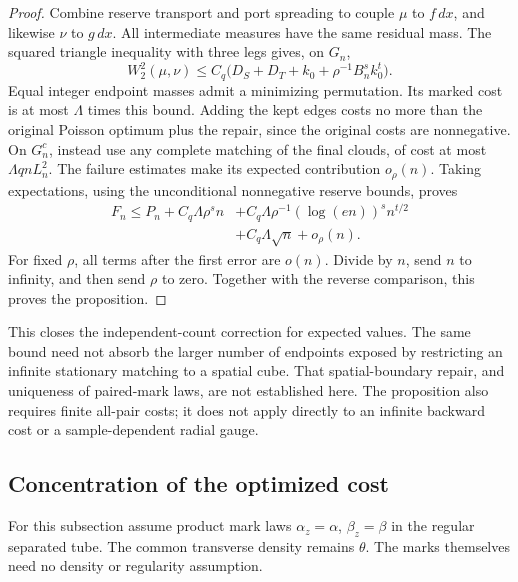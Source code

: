 \documentclass[11pt,reqno]{amsart}
\theoremstyle{definition}
\theoremstyle{remark}
\numberwithin{equation}{section}
\begin{document}
\begin{proof}
Combine reserve transport and port spreading to couple \(\mu\)
to \(f\,dx\), and likewise \(\nu\) to \(g\,dx\).
All intermediate measures have the same residual mass. The squared
triangle inequality with three legs gives, on \(G_n\),
\[
W_2^2(\mu,\nu)
 \le C_q\bigl(D_S+D_T+k_0+\rho^{-1}B_n^sk_0^t\bigr).
\]
Equal integer endpoint masses admit a minimizing permutation.
Its marked cost is at most \(\Lambda\) times this bound.
Adding the kept edges costs no more than the original Poisson optimum
plus the repair, since the original costs are nonnegative.
On \(G_n^c\), instead use any complete matching of the final
clouds, of cost at most \(\Lambda qnL_n^2\). The failure estimates
make its expected contribution \(o_\rho(n)\).
Taking expectations, using the unconditional nonnegative reserve
bounds, proves
\begin{equation}
\begin{split}
F_n\le P_n+C_q\Lambda\rho^s n
 &+C_q\Lambda\rho^{-1}(\log(en))^s n^{t/2}\\
 &+C_q\Lambda\sqrt n+o_\rho(n).
\end{split}
\label{eq:highd-count-repair}
\end{equation}
For fixed \(\rho\), all terms after the first error are \(o(n)\).
Divide by \(n\), send \(n\) to infinity, and then send
\(\rho\) to zero. Together with the reverse comparison, this
proves the proposition.
\end{proof}

This closes the independent-count correction for expected values.
The same bound need not absorb the larger number of endpoints exposed
by restricting an infinite stationary matching to a spatial cube.
That spatial-boundary repair, and uniqueness of paired-mark laws,
are not established here. The proposition also requires finite
all-pair costs; it does not apply directly to an infinite backward
cost or a sample-dependent radial gauge.

\subsection{Concentration of the optimized cost}
\label{subsec:highd-value-concentration}

For this subsection assume product mark laws
\(\alpha_z=\alpha\), \(\beta_z=\beta\) in the regular
separated tube. The common transverse density remains \(\theta\).
The marks themselves need no density or regularity assumption.
\end{document}

